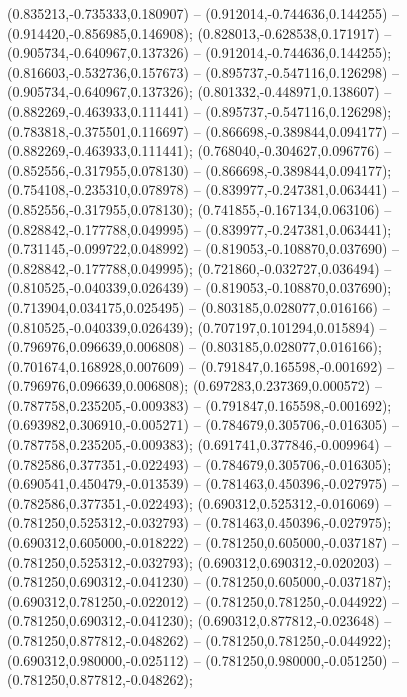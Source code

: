  (0.835213,-0.735333,0.180907) -- (0.912014,-0.744636,0.144255) -- (0.914420,-0.856985,0.146908);
 (0.828013,-0.628538,0.171917) -- (0.905734,-0.640967,0.137326) -- (0.912014,-0.744636,0.144255);
 (0.816603,-0.532736,0.157673) -- (0.895737,-0.547116,0.126298) -- (0.905734,-0.640967,0.137326);
 (0.801332,-0.448971,0.138607) -- (0.882269,-0.463933,0.111441) -- (0.895737,-0.547116,0.126298);
 (0.783818,-0.375501,0.116697) -- (0.866698,-0.389844,0.094177) -- (0.882269,-0.463933,0.111441);
 (0.768040,-0.304627,0.096776) -- (0.852556,-0.317955,0.078130) -- (0.866698,-0.389844,0.094177);
 (0.754108,-0.235310,0.078978) -- (0.839977,-0.247381,0.063441) -- (0.852556,-0.317955,0.078130);
 (0.741855,-0.167134,0.063106) -- (0.828842,-0.177788,0.049995) -- (0.839977,-0.247381,0.063441);
 (0.731145,-0.099722,0.048992) -- (0.819053,-0.108870,0.037690) -- (0.828842,-0.177788,0.049995);
 (0.721860,-0.032727,0.036494) -- (0.810525,-0.040339,0.026439) -- (0.819053,-0.108870,0.037690);
 (0.713904,0.034175,0.025495) -- (0.803185,0.028077,0.016166) -- (0.810525,-0.040339,0.026439);
 (0.707197,0.101294,0.015894) -- (0.796976,0.096639,0.006808) -- (0.803185,0.028077,0.016166);
 (0.701674,0.168928,0.007609) -- (0.791847,0.165598,-0.001692) -- (0.796976,0.096639,0.006808);
 (0.697283,0.237369,0.000572) -- (0.787758,0.235205,-0.009383) -- (0.791847,0.165598,-0.001692);
 (0.693982,0.306910,-0.005271) -- (0.784679,0.305706,-0.016305) -- (0.787758,0.235205,-0.009383);
 (0.691741,0.377846,-0.009964) -- (0.782586,0.377351,-0.022493) -- (0.784679,0.305706,-0.016305);
 (0.690541,0.450479,-0.013539) -- (0.781463,0.450396,-0.027975) -- (0.782586,0.377351,-0.022493);
 (0.690312,0.525312,-0.016069) -- (0.781250,0.525312,-0.032793) -- (0.781463,0.450396,-0.027975);
 (0.690312,0.605000,-0.018222) -- (0.781250,0.605000,-0.037187) -- (0.781250,0.525312,-0.032793);
 (0.690312,0.690312,-0.020203) -- (0.781250,0.690312,-0.041230) -- (0.781250,0.605000,-0.037187);
 (0.690312,0.781250,-0.022012) -- (0.781250,0.781250,-0.044922) -- (0.781250,0.690312,-0.041230);
 (0.690312,0.877812,-0.023648) -- (0.781250,0.877812,-0.048262) -- (0.781250,0.781250,-0.044922);
 (0.690312,0.980000,-0.025112) -- (0.781250,0.980000,-0.051250) -- (0.781250,0.877812,-0.048262);
